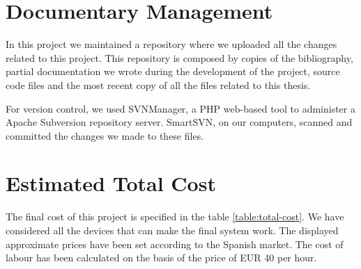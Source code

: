 \bigskip
\section{Documentary Management}
In this project we maintained a repository where we uploaded all the changes related to this project. This repository is composed
by copies of the bibliography, partial documentation we wrote during the development of the project, source code files and the most
recent copy of all the files related to this thesis.

For version control, we used SVNManager, a PHP web-based tool to administer a Apache Subversion repository server. SmartSVN, on
our computers, scanned and committed the changes we made to these files.

\bigskip
\section{Estimated Total Cost}

The final cost of this project is specified in the table \ref{table:total-cost}. We have considered all the devices that can make
the final system work. The displayed approximate prices have been set according to the Spanish market. The cost of labour has been 
calculated on the basis of the price of EUR 40 per hour.

\begin{table}[]
	\centering
	\caption{Estimated total cost of this project}
	\label{table:total-cost}
\end{table}

